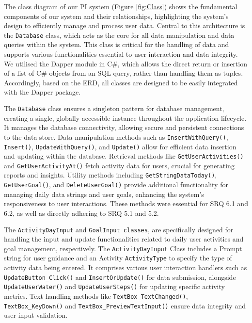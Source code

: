 \documentclass[11pt]{article}
\begin{document}
The class diagram of our PI system (Figure \ref{fig:Class}) shows the
fundamental components of our system and their relationships, highlighting the system's
design to efficiently manage and process user data. Central to this
architecture is the \texttt{Database} class, which acts as the core for all
data manipulation and data queries within the system. This class is
critical for the handling of data and supports various functionalities
essential to user interaction and data integrity. We utilised the Dapper module 
in C\#, which allows the direct return or insertion of a list of 
C\# objects from an SQL query, rather than handling them as tuples. 
Accordingly, based on the ERD, all classes are designed to be easily integrated 
with the Dapper package.\par

\newpage

The \texttt{Database} class ensures a singleton pattern for database management,
creating a single, globally accessible instance throughout the application
lifecycle. It manages the database connectivity, allowing secure and
persistent connections to the data store. Data manipulation methods such as
\texttt{InsertWithQuery()}, \texttt{Insert()}, \texttt{UpdateWithQuery()}, and \texttt{Update()} allow for
efficient data insertion and updating within the database. Retrieval methods
like \texttt{GetUserActivities()} and \texttt{GetUserActivityAt()} fetch activity data for users,
crucial for generating reports and insights. Utility methods including
\texttt{GetStringDataToday()}, \texttt{GetUserGoal()}, and \texttt{DeleteUserGoal()} provide additional
functionality for managing daily data strings and user goals, enhancing the
system’s responsiveness to user interactions. These methods were essential for
SRQ 6.1 and 6.2, as well as directly adhering to SRQ 5.1 and 5.2. \par

The \texttt{ActivityDayInput} and \texttt{GoalInput classes}, are specifically
designed for handling the input and update functionalities related to daily
user activities and goal management, respectively. The
\texttt{ActivityDayInput} Class includes a Prompt string for user guidance and
an Activity \texttt{ActivityType} to specify the type of activity data being
entered. It comprises various user interaction handlers such as
\texttt{UpdateButton\_Click()} and \texttt{InsertOrUpdate()} for data
submission, alongside \texttt{UpdateUserWater()} and \texttt{UpdateUserSteps()}
for updating specific activity metrics. Text handling methods like
\texttt{TextBox\_TextChanged()}, \texttt{TextBox\_KeyDown()} and
\texttt{TextBox\_PreviewTextInput()} ensure data integrity and user input
validation.\par
\end{document}
